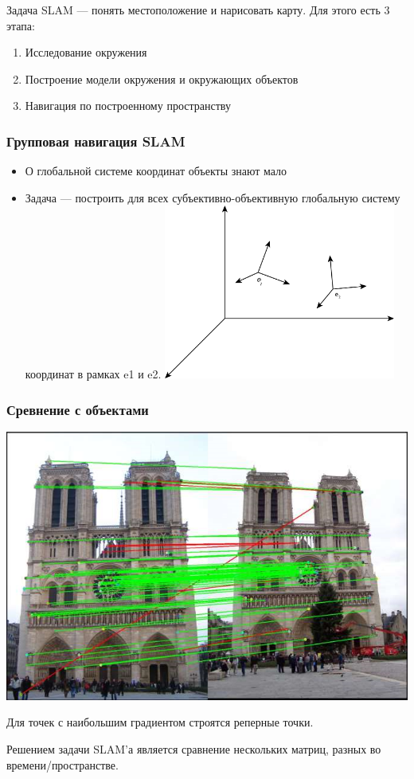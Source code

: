 \documentclass{article}
\begin{document}
\begin{sloppypar}
    Задача SLAM — понять местоположение и нарисовать карту. Для этого есть 3 этапа:
    \begin{enumerate}
        \item Исследование окружения
        \item Построение модели окружения и окружающих объектов
        \item Навигация по построенному пространству
    \end{enumerate}

    \subsubsection{Групповая навигация SLAM}
    \begin{itemize}
        \item О глобальной системе координат объекты знают мало
        \item Задача — построить для всех субъективно-объективную глобальную систему координат в рамках e1 и e2.
              \includegraphics[width=0.6\textwidth]{graphics/SLAM.png}
    \end{itemize}

    \subsubsection{Сревнение с объектами}

    \includegraphics[width=\textwidth]{graphics/сравнение_с_объектами.png}

    Для точек с наибольшим градиентом строятся реперные точки.

    Решением задачи SLAM'а является сравнение нескольких матриц, разных во времени/пространстве.


\end{sloppypar}
\end{document}
